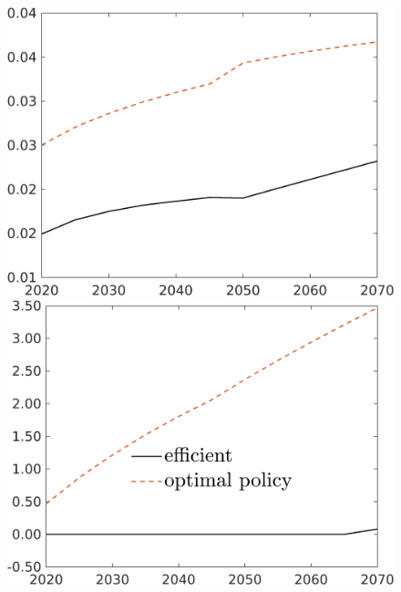 \begin{figure}[h!!]
\begin{minipage}[]{0.32\textwidth}
	\end{minipage}
	\begin{minipage}[]{0.32\textwidth}
		\includegraphics[width=1\textwidth]{../../codding_model/own_basedOnFried/optimalPol_190722_tidiedUp/figures/all_Aout22/hl_PercentageBAUDyn_Target_regime3_spillover0_noskill0_sep1_xgrowth0_etaa0.79_lgd0.png}
	\end{minipage}
	\begin{minipage}[]{0.32\textwidth}
		\includegraphics[width=1\textwidth]{../../codding_model/own_basedOnFried/optimalPol_190722_tidiedUp/figures/all_Aout22/AgAf_PercentageEffOptDyn_Target_regime3_spillover0_noskill1_sep1_xgrowth0_etaa0.79_lgd1.png}

\end{minipage}
\end{figure}
